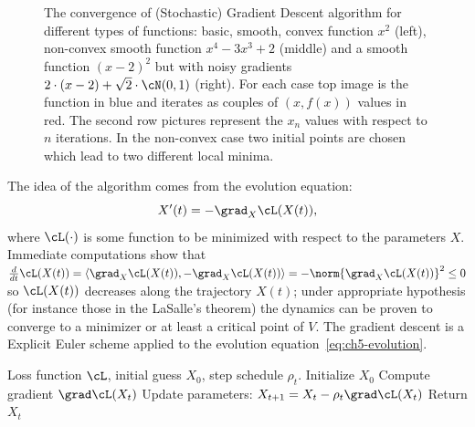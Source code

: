 \begin{figure}[h]\centering
\caption{The convergence of (Stochastic) Gradient Descent algorithm for different types of functions: basic, smooth, convex function $x^2$ (left), non-convex smooth function $x^4 - 3x^3 + 2$ (middle) and a smooth function $(x-2)^2$ but with noisy gradients $2 \cdot (x-2) + \sqrt{2} \cdot \cN(0,1)$ (right). For each case top image is the function in blue and iterates as couples of $(x, f(x))$ values in red. The second row pictures represent the $x_n$ values with respect to $n$ iterations. In the non-convex case two initial points are chosen which lead to two different local minima.}
\label{fig:ch5-sgd-convergence}
\end{figure}

\begin{advancedtopics}\label{adv:ch5-evolution-eq}
The idea of the algorithm comes from the evolution equation:
\begin{equation}\label{eq:ch5-evolution}
X'(t) = -\grad_X \cL(X(t)),
\end{equation}
where $\cL(\cdot)$ is some function to be minimized with respect to the parameters $X$. Immediate computations show that $\frac{d}{dt} \cL(X(t)) = \langle \grad_X \cL(X(t)), -\grad_X \cL(X(t))\rangle = -\norm{\grad_X \cL(X(t))}^2 \leq 0$ so $\cL(X(t))$ decreases along the trajectory $X(t)$; under appropriate hypothesis (for instance those in the LaSalle's theorem) the dynamics can be proven to converge to a minimizer or at least a critical point of $V$. The gradient descent is a Explicit Euler scheme applied to the evolution equation~\eqref{eq:ch5-evolution}.
\end{advancedtopics}

\begin{algorithm}[h]
\caption{Gradient Descent (GD)}\label{alg:ch5-gd}
\begin{algorithmic}[1]
\Require Loss function $\cL$, initial guess $X_0$, step schedule $\rho_t$.
\State Initialize $X_0$
    \State Compute gradient $\grad \cL(X_t)$
    \State Update parameters: $X_{t+1} = X_t - \rho_t \grad \cL(X_t)$
\EndFor
\State Return $X_t$
\end{algorithmic}
\end{algorithm}

